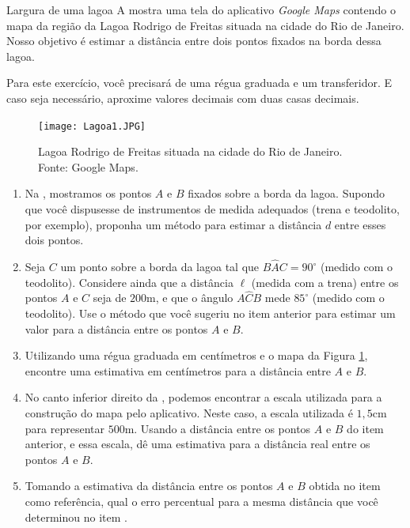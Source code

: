 \begin{task}{Largura de uma lagoa}
A  mostra uma tela do aplicativo {\textit{Google Maps}} contendo o mapa da região da Lagoa Rodrigo de Freitas situada na cidade do Rio de Janeiro. Nosso objetivo é estimar a distância entre dois pontos fixados na borda dessa lagoa.

Para este exercício, você precisará de uma régua graduada e um transferidor. E caso seja necessário, aproxime valores decimais com duas casas decimais.
\begin{figure}[H]
    \centering
    \texttt{[image: Lagoa1.JPG]}
    \caption{Lagoa Rodrigo de Freitas situada na cidade do Rio de Janeiro. Fonte: Google Maps.}
    \label{Lagoa1}
\end{figure}

\begin{enumerate}
\item{}
Na , mostramos os pontos $A$ e $B$ fixados sobre a borda da lagoa. Supondo que você dispusesse de instrumentos de medida adequados (trena e teodolito, por exemplo), proponha um método para estimar a distância $d$ entre esses dois pontos.

\item{}
Seja $C$ um ponto sobre a borda da lagoa tal que $B\hat{A}C=90^\circ$ (medido com o teodolito). Considere ainda que a distância $\ell$ (medida com a trena) entre os pontos $A$ e $C$ seja de $200$m, e que o ângulo $A\hat{C}B$ mede $85^\circ$ (medido com o teodolito). Use o método que você sugeriu no item anterior para estimar um valor para a distância entre os pontos $A$ e $B$.

\item{}
Utilizando uma régua graduada em centímetros e o mapa da Figura \ref{Lagoa1}, encontre uma estimativa em centímetros para a distância entre $A$ e $B$.

\item{}
No canto inferior direito da , podemos encontrar a escala utilizada para a construção do mapa pelo aplicativo. Neste caso, a escala utilizada é $1,5$cm para representar $500$m. Usando a distância entre os pontos $A$ e $B$ do item anterior, e essa escala, dê uma estimativa para a distância real entre os pontos $A$ e $B$.

\item{}
Tomando a estimativa da distância entre os pontos $A$ e $B$ obtida no item  como referência, qual o erro percentual para a mesma distância que você determinou no item .
\end{enumerate}
\end{task}

